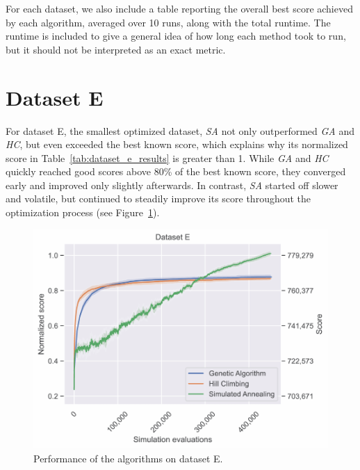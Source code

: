 For each dataset, we also include a table reporting the overall best score achieved by each algorithm, averaged over 10 runs, along with the total runtime. The runtime is included to give a general idea of how long each method took to run, but it should not be interpreted as an exact metric.

\newpage
\section{Dataset E} \label{sec:dataset_e}

For dataset E, the smallest optimized dataset, \textit{SA} not only outperformed \textit{GA} and \textit{HC}, but even exceeded the best known score, which explains why its normalized score in Table~\ref{tab:dataset_e_results} is greater than 1. While \textit{GA} and \textit{HC} quickly reached good scores above 80\% of the best known score, they converged early and improved only slightly afterwards. In contrast, \textit{SA} started off slower and volatile, but continued to steadily improve its score throughout the optimization process (see Figure~\ref{fig:dataset_e_experiment}).

\bigskip

\begin{figure}[h]
    \centering
    \includegraphics[width=\linewidth]{img/experiments/pdfa-e_Genetic Algorithm_Hill Climbing_Simulated Annealing.pdf}
    \caption[Performance of the algorithms on dataset E]{
        Performance of the algorithms on dataset E.
    }
    \label{fig:dataset_e_experiment}
\end{figure}


